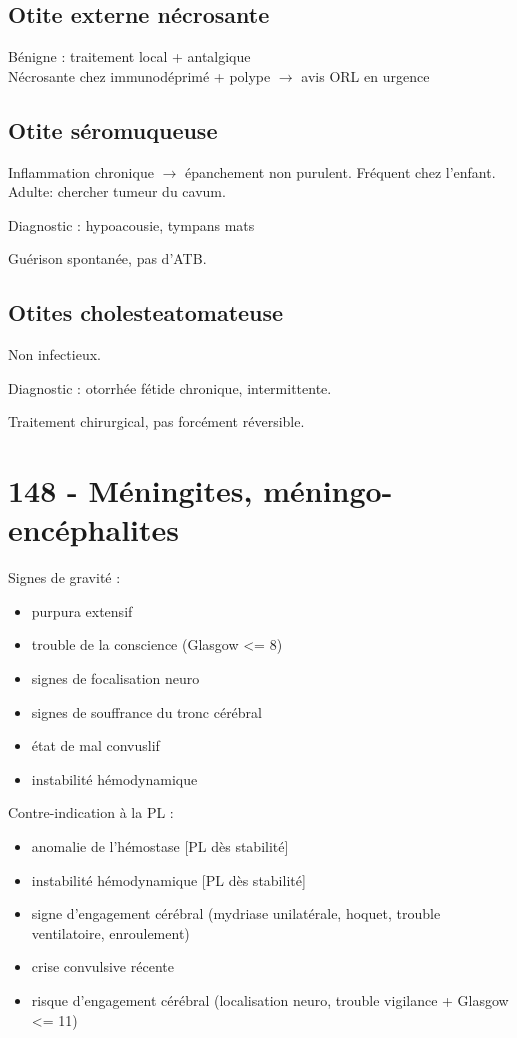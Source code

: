 \subsection{Otite externe nécrosante}%
\label{sub:otite_externe_necrosante}

Bénigne : traitement local + antalgique\\
Nécrosante chez immunodéprimé + polype $\to$ avis ORL en urgence 

\subsection{Otite séromuqueuse}%
\label{sub:otite_seromuqueuse}
Inflammation chronique $\rightarrow$ épanchement non purulent. Fréquent chez
l'enfant. Adulte: chercher tumeur du cavum.

Diagnostic : hypoacousie, tympans mats

Guérison spontanée, pas d'ATB.

\subsection{Otites cholesteatomateuse}%
\label{sub:otites_choestatomateuse}
Non infectieux. 

Diagnostic : otorrhée fétide chronique, intermittente.

Traitement chirurgical, pas forcément réversible.


\section{148 - Méningites, méningo-encéphalites}

Signes de gravité :

\begin{itemize}
\item purpura extensif
\item trouble de la conscience (Glasgow \textless{}= 8)
\item signes de focalisation neuro
\item signes de souffrance du tronc cérébral
\item état de mal convuslif
\item instabilité hémodynamique
\end{itemize}

Contre-indication à la PL :

\begin{itemize}
\item
  anomalie de l'hémostase {[}PL dès stabilité{]}
\item
  instabilité hémodynamique {[}PL dès stabilité{]}
\item
  signe d'engagement cérébral (mydriase unilatérale, hoquet, trouble
  ventilatoire, enroulement) {}
\item
  crise convulsive récente
\item
  risque d'engagement cérébral (localisation neuro, trouble vigilance +
  Glasgow \textless{}= 11) {}
\end{itemize}

